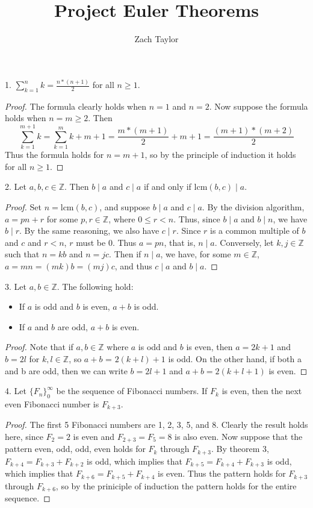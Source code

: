 \documentclass[12pt]{article}
\newcommand{\Z}{\mathbb{Z}}
\begin{document}
\title{Project Euler Theorems}
\author{Zach Taylor}
\maketitle

1. $\sum_{k=1}^n{k} = \frac{n*(n+1)}{2}$ for all $n \geq 1$.
\begin{proof}
  The formula clearly holds when $n=1$ and $n=2$. Now suppose the formula holds 
  when $n = m \geq 2$. Then 
  $$\sum_{k=1}^{m+1}{k} = \sum_{k=1}^m{k} + m + 1 = \frac{m*(m+1)}{2} + m + 1
  = \frac{(m+1)*(m+2)}{2}$$
  Thus the formula holds for $n = m + 1$, so by the principle of induction it holds 
  for all $n \geq 1$.
\end{proof}
\bigbreak

2. Let $a, b, c \in \Z$. Then $b \mid a$ and $c \mid a$ if and only if 
$\text{lcm}(b, c) \mid a$.
\begin{proof}
  Set $n = \text{lcm}(b, c)$, and suppose $b \mid a$ and $c \mid a$. By the 
  division algorithm, $a = pn + r$ for some $p,r \in \Z$, where $0 \leq r < n$. 
  Thus, since $b \mid a$ and $b \mid n$, we have $b \mid r$. By the same reasoning, we
  also have $c \mid r$. Since $r$ is a common multiple of $b$ and $c$ and $r < n$,
  $r$ must be $0$. Thus $a = pn$, that is, $n \mid a$.
  Conversely, let $k, j \in \Z$ such that $n = kb$ and $n = jc$. Then if
  $n \mid a$, we have, for some $m \in \Z$, $a = mn = (mk)b = (mj)c$, and thus
  $c \mid a$ and $b \mid a$.
\end{proof}
\bigbreak

3. Let $a, b \in \Z$. The following hold:
\begin{itemize}
  \item If $a$ is odd and $b$ is even, $a + b$ is odd. 
  \item If $a$ and $b$ are odd, $a + b$ is even.
\end{itemize}
\begin{proof}
  Note that if $a, b \in \Z$ where $a$ is odd and $b$ is even, then
  $a = 2k + 1$ and $b = 2l$ for $k, l \in \Z$, so $a + b$ = $2(k+l) + 1$ is odd.
  On the other hand, if both a and b are odd, then we can write $b = 2l + 1$ and
  $a + b = 2(k + l + 1)$ is even.
\end{proof}
\bigbreak

4. Let $\{F_n\}_0^{\infty}$ be the sequence of Fibonacci numbers. If $F_k$ is even, 
then the next even Fibonacci number is $F_{k+3}$.
\begin{proof}
  The first 5 Fibonacci numbers are 1, 2, 3, 5, and 8. Clearly the result holds
  here, since $F_2 = 2$ is even and $F_{2+3} = F_5 = 8$ is also even. Now suppose
  that the pattern even, odd, odd, even holds for $F_k$ through $F_{k+3}$.
  By theorem 3, $F_{k+4} = F_{k+3} + F_{k+2}$ is odd, which implies that
  $F_{k+5} = F_{k+4} + F_{k+3}$ is odd, which implies that
  $F_{k+6} = F_{k+5} + F_{k+4}$ is even. Thus the pattern holds for $F_{k+3}$
  through $F_{k+6}$, so by the priniciple of induction the pattern holds for the
  entire sequence.
\end{proof}
\bigbreak
\end{document}
